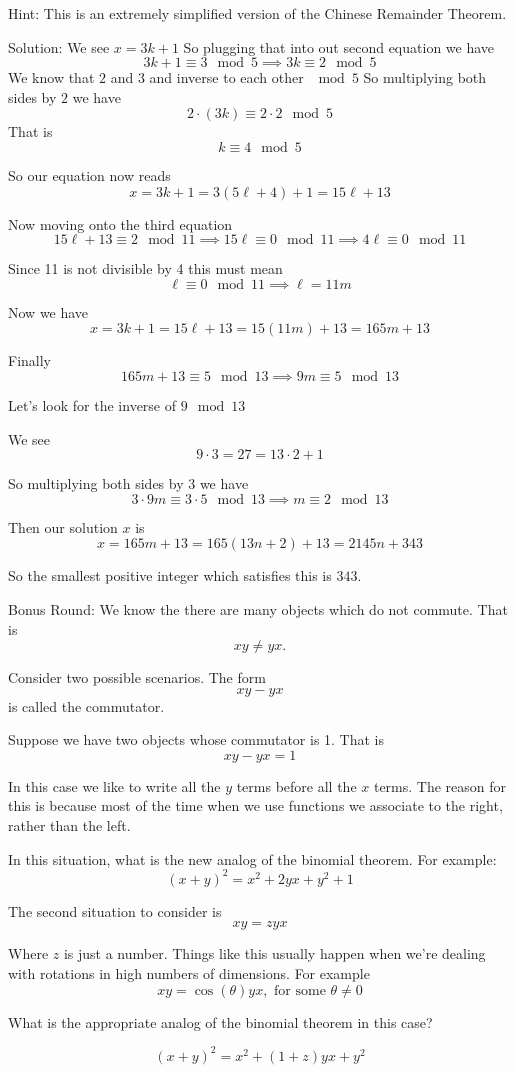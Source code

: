 \documentclass[16 pt]{amsart}
\theoremstyle{definition}
\theoremstyle{remark}
\numberwithin{equation}{subsection}
\begin{document}
\vspace{.25in}

Hint: This is an extremely simplified version of the Chinese Remainder Theorem.


\vspace{.5in}

Solution: We see $x =3k+1$ So plugging that into out second equation we have
\[
3k+1 \equiv 3 \mod{5} \implies 3k \equiv 2 \mod{5}
\]
We know that $2$ and $3$ and inverse to each other $\mod{5}$ So multiplying both sides by $2$ we have
\[
2\cdot (3k) \equiv 2\cdot 2 \mod{5}
\]
That is
\[
k\equiv 4 \mod{5}
\]

So our equation now reads
\[
x = 3k+1 = 3(5\ell + 4) + 1 = 15\ell + 13
\]

Now moving onto the third equation
\[
15\ell + 13 \equiv 2 \mod{11} \implies 15\ell \equiv 0 \mod{11} \implies 4\ell \equiv 0 \mod{11}
\]

Since 11 is not divisible by 4 this must mean
\[
\ell \equiv 0 \mod{11} \implies \ell = 11m
\]

Now we have
\[
x = 3k+1 = 15\ell+ 13 = 15(11m) + 13 = 165m+13
\]

Finally
\[
165 m + 13 \equiv 5 \mod{13} \implies 9m\equiv 5 \mod{13}
\]

Let's look for the inverse of $9 \mod{13}$

We see
\[
9\cdot 3 = 27 = 13\cdot 2 + 1
\]

So multiplying both sides by 3 we have
\[
3\cdot 9m \equiv 3\cdot 5 \mod{13} \implies m \equiv 2 \mod{13}
\]

Then our solution $x$ is
\[
x = 165m + 13 = 165(13n+2)+13 = 2145n + 343 
\]

So the smallest positive integer which satisfies this is $343$.


\newpage


Bonus Round:  We know the there are many objects which do not commute.  That is
\[
xy \ne yx.
\]

Consider two possible scenarios.  The form
\[
xy -yx 
\]
is called the commutator.

Suppose we have two objects whose commutator is 1.
That is
\[
xy-yx = 1
\]

In this case we like to write all the $y$ terms before all the $x$ terms.  The reason for this is because most of the time when we use functions we associate to the right, rather than the left.

In this situation, what is the new analog of the binomial theorem.  For example:
\[
(x+y)^2 = x^2 + 2yx + y^2 + 1
\]


The second situation to consider is
\[
xy = zyx
\]

Where $z$ is just a number.  Things like this usually happen when we're dealing with rotations in high numbers of dimensions.  For example
\[
xy = \cos(\theta) yx, \text{ for some } \theta \ne 0
\]

What is the appropriate analog of the binomial theorem in this case?

\[
(x+y)^2 = x^2 + (1+z)yx + y^2
\]
\end{document}
